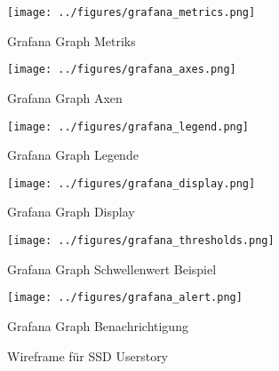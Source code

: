 \begin{figure}[tbp]
  \centering
  \texttt{[image: ../figures/grafana\_metrics.png]}
  \caption{Grafana Graph Metriks}
\label{figure:grafana_metrics}
\end{figure}

\begin{figure}[tbp]
  \centering
  \texttt{[image: ../figures/grafana\_axes.png]}
  \caption{Grafana Graph Axen}
\label{figure:grafana_axes}
\end{figure}

\begin{figure}[tbp]
  \centering
  \texttt{[image: ../figures/grafana\_legend.png]}
  \caption{Grafana Graph Legende}
\label{figure:grafana_legend}
\end{figure}

\begin{figure}[tbp]
  \centering
  \texttt{[image: ../figures/grafana\_display.png]}
  \caption{Grafana Graph Display}
\label{figure:grafana_display}
\end{figure}

\begin{figure}[tbp]
  \centering
  \texttt{[image: ../figures/grafana\_thresholds.png]}
  \caption{Grafana Graph Schwellenwert Beispiel}
\label{figure:grafana_thresholds}
\end{figure}

\begin{figure}[tbp]
  \centering
  \texttt{[image: ../figures/grafana\_alert.png]}
  \caption{Grafana Graph Benachrichtigung}
\label{figure:grafana_alert}
\end{figure}

\begin{figure}[tbp]
  \centering
  
  \caption{Wireframe für SSD Userstory}
\label{figure:ssduserstory}
\end{figure}

